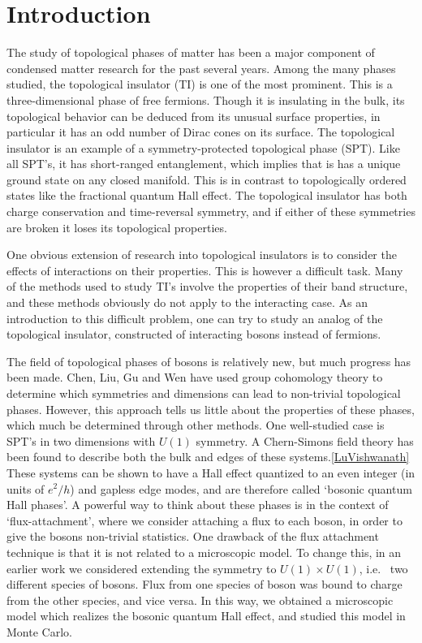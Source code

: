 \documentclass[prb,twocolumn]{revtex4-1}
\begin{document}
\section{Introduction}
The study of topological phases of matter has been a major component of condensed matter research for the past several years. Among the many phases studied, the topological insulator (TI) is one of the most prominent. This is a three-dimensional phase of free fermions. Though it is insulating in the bulk, its topological behavior can be deduced from its unusual surface properties, in particular it has an odd number of Dirac cones on its surface. The topological insulator is an example of a symmetry-protected topological phase (SPT). Like all SPT's, it has short-ranged entanglement, which implies that is has a unique ground state on any closed manifold. This is in contrast to topologically ordered states like the fractional quantum Hall effect. The topological insulator has both charge conservation and time-reversal symmetry, and if either of these symmetries are broken it loses its topological properties.

One obvious extension of research into topological insulators is to consider the effects of interactions on their properties. This is however a difficult task. Many of the methods used to study TI's involve the properties of their band structure, and these methods obviously do not apply to the interacting case. As an introduction to this difficult problem, one can try to study an analog of the topological insulator, constructed of interacting bosons instead of fermions. 

The field of topological phases of bosons is relatively new, but much progress has been made. Chen, Liu, Gu and Wen\cite{WenScience,*WenPRB} have used group cohomology theory to determine which symmetries and dimensions can lead to non-trivial topological phases. However, this approach tells us little about the properties of these phases, which much be determined through other methods. One well-studied case is SPT's in two dimensions with $U(1)$ symmetry. A Chern-Simons field theory has been found to describe both the bulk and edges of these systems.\ref{LuVishwanath} These systems can be shown to have a Hall effect quantized to an even integer (in units of $e^2/h$) and gapless edge modes, and are therefore called `bosonic quantum Hall phases'. A powerful way to think about these phases is in the context of `flux-attachment', where we consider attaching a flux to each boson, in order to give the bosons non-trivial statistics.\cite{SenthilLevin} One drawback of the flux attachment technique is that it is not related to a microscopic model. To change this, in an earlier work we considered extending the symmetry to $U(1)\times U(1)$, i.e.~ two different species of bosons. Flux from one species of boson was bound to charge from the other species, and vice versa. In this way, we obtained a microscopic model which realizes the bosonic quantum Hall effect, and studied this model in Monte Carlo.\cite{FQHE} 
\end{document}
